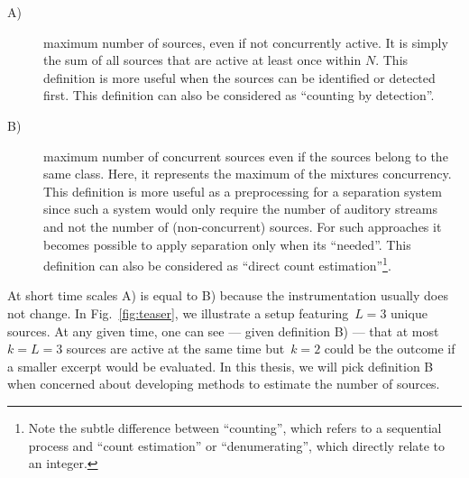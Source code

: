 \begin{description}
\item[A)] maximum number of sources, even if not concurrently active. It is simply the sum of all sources that are active at least once within \(N\). This definition is more useful when the sources can be identified or detected first. This definition can also be considered as ``counting by detection''.
\item[B)] maximum number of concurrent sources even if the sources belong to the same class. Here, it represents the maximum of the mixtures concurrency. This definition is more useful as a preprocessing for a separation system since such a system would only require the number of auditory streams and not the number of (non-concurrent) sources. For such approaches it becomes possible to apply separation only when its ``needed''. This definition can also be considered as ``direct count estimation''\footnote{Note the subtle difference between ``counting'', which refers to a sequential process and ``count estimation'' or ``denumerating'', which directly relate to an integer.}.
\end{description}

At short time scales A) is equal to B) because the instrumentation usually does not change. 
In Fig.~\ref{fig:teaser}, we illustrate a setup featuring~$L=3$ unique sources.
At any given time, one can see --- given definition B) --- that at most~$k=L=3$ sources are active at the same time but~$k=2$ could be the outcome if a smaller excerpt would be evaluated.
In this thesis, we will pick definition B when concerned about developing methods to estimate the number of sources.